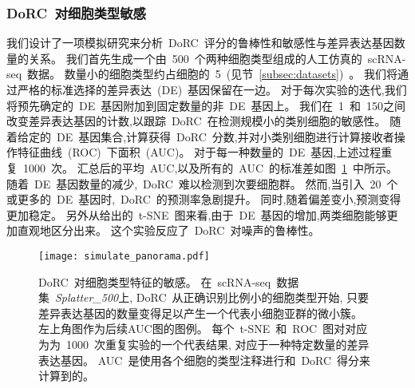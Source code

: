 \subsubsection{DoRC~对细胞类型敏感}
我们设计了一项模拟研究来分析~DoRC~评分的鲁棒性和敏感性与差异表达基因数量的关系。
我们首先生成一个由~500~个两种细胞类型组成的人工仿真的~scRNA-seq~数据。
数量小的细胞类型约占细胞的~5\％~(见节~\ref{subsec:datasets})~。
我们将通过严格的标准选择的差异表达~(DE)~基因保留在一边。
对于每次实验的迭代,我们将预先确定的~DE~基因附加到固定数量的非~DE~基因上。
我们在~1~和~150之间改变差异表达基因的计数,以跟踪~DoRC~在检测规模小的类别细胞的敏感性。
随着给定的~DE~基因集合,计算获得~DoRC~分数,并对小类别细胞进行计算接收者操作特征曲线~(ROC)~下面积~(AUC)。
对于每一种数量的~DE~基因,上述过程重复~1000~次。
汇总后的平均~AUC,以及所有的~AUC~的标准差如图~\ref{fig:simulate:roc}~中所示。
随着~DE~基因数量的减少,~DoRC~难以检测到次要细胞群。
然而,当引入~20~个或更多的~DE~基因时,~DoRC~的预测率急剧提升。
同时,随着偏差变小,预测变得更加稳定。
另外从给出的~t-SNE~图来看,由于~DE~基因的增加,两类细胞能够更加直观地区分出来。
这个实验反应了~DoRC~对噪声的鲁棒性。

\begin{figure}[!htbp]
    \centering
    \texttt{[image: simulate\_panorama.pdf]}
    \caption{
    DoRC~对细胞类型特征的敏感。
    在~scRNA-seq~数据集~\textit{Splatter\_500}上,
    DoRC~从正确识别比例小的细胞类型开始,
    只要差异表达基因的数量变得足以产生一个代表小细胞亚群的微小簇。
    左上角图作为后续AUC图的图例。
    每个~t-SNE~和~ROC~图对对应为为~1000~次重复实验的一个代表结果,
    对应于一种特定数量的差异表达基因。
    AUC~是使用各个细胞的类型注释进行和~DoRC~得分来计算到的。
    }
    \label{fig:simulate:roc}
\end{figure}

